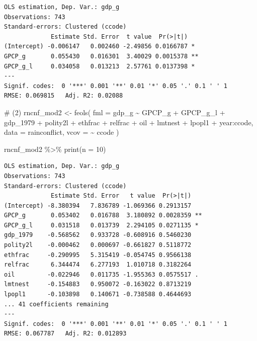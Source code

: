 \documentclass[
  a4paper,
  DIV=11,
  oneside]{scrreprt}
\newenvironment{Shaded}{\begin{snugshade}}{\end{snugshade}}
\newcommand{\AttributeTok}[1]{\textcolor[rgb]{0.40,0.45,0.13}{#1}}
\newcommand{\CommentTok}[1]{\textcolor[rgb]{0.37,0.37,0.37}{#1}}
\newcommand{\DecValTok}[1]{\textcolor[rgb]{0.68,0.00,0.00}{#1}}
\newcommand{\FunctionTok}[1]{\textcolor[rgb]{0.28,0.35,0.67}{#1}}
\newcommand{\NormalTok}[1]{\textcolor[rgb]{0.00,0.23,0.31}{#1}}
\newcommand{\OtherTok}[1]{\textcolor[rgb]{0.00,0.23,0.31}{#1}}
\newcommand{\SpecialCharTok}[1]{\textcolor[rgb]{0.37,0.37,0.37}{#1}}
\begin{document}
\begin{verbatim}
OLS estimation, Dep. Var.: gdp_g
Observations: 743
Standard-errors: Clustered (ccode) 
             Estimate Std. Error  t value  Pr(>|t|)    
(Intercept) -0.006147   0.002460 -2.49856 0.0166787 *  
GPCP_g       0.055430   0.016301  3.40029 0.0015378 ** 
GPCP_g_l     0.034058   0.013213  2.57761 0.0137398 *  
---
Signif. codes:  0 '***' 0.001 '**' 0.01 '*' 0.05 '.' 0.1 ' ' 1
RMSE: 0.069815   Adj. R2: 0.02088
\end{verbatim}

\begin{Shaded}
\begin{Highlighting}[]
\CommentTok{\# (2)}
\NormalTok{rncnf\_mod2 }\OtherTok{\textless{}{-}} \FunctionTok{feols}\NormalTok{(}
  \AttributeTok{fml =}\NormalTok{ gdp\_g }\SpecialCharTok{\textasciitilde{}}\NormalTok{ GPCP\_g }\SpecialCharTok{+}\NormalTok{ GPCP\_g\_l}
  \SpecialCharTok{+}\NormalTok{ gdp\_1979}
  \SpecialCharTok{+}\NormalTok{ polity2l }
  \SpecialCharTok{+}\NormalTok{ ethfrac }
  \SpecialCharTok{+}\NormalTok{ relfrac }
  \SpecialCharTok{+}\NormalTok{ oil }
  \SpecialCharTok{+}\NormalTok{ lmtnest }
  \SpecialCharTok{+}\NormalTok{ lpopl1}
  \SpecialCharTok{+}\NormalTok{ year}\SpecialCharTok{:}\NormalTok{ccode,}
  \AttributeTok{data =}\NormalTok{ rainconflict,}
  \AttributeTok{vcov =} \SpecialCharTok{\textasciitilde{}}\NormalTok{ ccode}
\NormalTok{) }

\NormalTok{rncnf\_mod2 }\SpecialCharTok{\%\textgreater{}\%} 
  \FunctionTok{print}\NormalTok{(}\AttributeTok{n =} \DecValTok{10}\NormalTok{)}
\end{Highlighting}
\end{Shaded}

\begin{verbatim}
OLS estimation, Dep. Var.: gdp_g
Observations: 743
Standard-errors: Clustered (ccode) 
             Estimate Std. Error   t value  Pr(>|t|)    
(Intercept) -8.380394   7.836789 -1.069366 0.2913157    
GPCP_g       0.053402   0.016788  3.180892 0.0028359 ** 
GPCP_g_l     0.031518   0.013739  2.294105 0.0271135 *  
gdp_1979    -0.568562   0.933728 -0.608916 0.5460230    
polity2l    -0.000462   0.000697 -0.661827 0.5118772    
ethfrac     -0.290995   5.315419 -0.054745 0.9566138    
relfrac      6.344474   6.277193  1.010718 0.3182264    
oil         -0.022946   0.011735 -1.955363 0.0575517 .  
lmtnest     -0.154883   0.950072 -0.163022 0.8713219    
lpopl1      -0.103898   0.140671 -0.738588 0.4644693    
... 41 coefficients remaining
---
Signif. codes:  0 '***' 0.001 '**' 0.01 '*' 0.05 '.' 0.1 ' ' 1
RMSE: 0.067787   Adj. R2: 0.012893
\end{verbatim}
\end{document}
